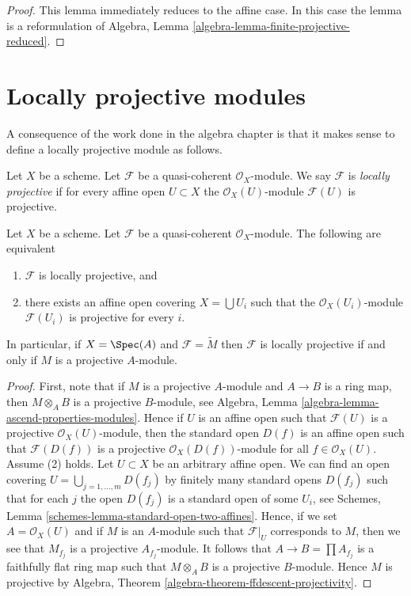 \begin{proof}
This lemma immediately reduces to the affine case.
In this case the lemma is a reformulation of
Algebra, Lemma \ref{algebra-lemma-finite-projective-reduced}.
\end{proof}




\section{Locally projective modules}
\label{section-locally-projective}

\noindent
A consequence of the work done in the algebra chapter is that it
makes sense to define a locally projective module as follows.

\begin{definition}
\label{definition-locally-projective}
Let $X$ be a scheme. Let $\mathcal{F}$ be a quasi-coherent
$\mathcal{O}_X$-module. We say $\mathcal{F}$ is {\it locally projective}
if for every affine open $U \subset X$ the $\mathcal{O}_X(U)$-module
$\mathcal{F}(U)$ is projective.
\end{definition}

\begin{lemma}
\label{lemma-locally-projective}
Let $X$ be a scheme.
Let $\mathcal{F}$ be a quasi-coherent $\mathcal{O}_X$-module.
The following are equivalent
\begin{enumerate}
\item $\mathcal{F}$ is locally projective, and
\item there exists an affine open covering $X = \bigcup U_i$
such that the $\mathcal{O}_X(U_i)$-module
$\mathcal{F}(U_i)$ is projective for every $i$.
\end{enumerate}
In particular, if $X = \Spec(A)$ and $\mathcal{F} = \widetilde{M}$
then $\mathcal{F}$ is locally projective if and only if $M$ is a projective
$A$-module.
\end{lemma}

\begin{proof}
First, note that if $M$ is a projective $A$-module and $A \to B$ is a
ring map, then $M \otimes_A B$ is a projective $B$-module, see
Algebra, Lemma \ref{algebra-lemma-ascend-properties-modules}.
Hence if $U$ is an affine open such that $\mathcal{F}(U)$ is a projective
$\mathcal{O}_X(U)$-module, then the standard open $D(f)$ is an
affine open such that $\mathcal{F}(D(f))$ is a projective
$\mathcal{O}_X(D(f))$-module for all $f \in \mathcal{O}_X(U)$.
Assume (2) holds. Let $U \subset X$ be an arbitrary affine open.
We can find an open covering $U = \bigcup_{j = 1, \ldots, m} D(f_j)$
by finitely many standard opens $D(f_j)$ such that for each
$j$ the open $D(f_j)$ is a standard open of some $U_i$, see
Schemes, Lemma \ref{schemes-lemma-standard-open-two-affines}.
Hence, if we set $A = \mathcal{O}_X(U)$ and if $M$ is an $A$-module
such that $\mathcal{F}|_U$ corresponds to $M$, then we see that
$M_{f_j}$ is a projective $A_{f_j}$-module. It follows that
$A \to B = \prod A_{f_j}$ is a faithfully flat ring map
such that $M \otimes_A B$ is a projective $B$-module.
Hence $M$ is projective by
Algebra, Theorem \ref{algebra-theorem-ffdescent-projectivity}.
\end{proof}

